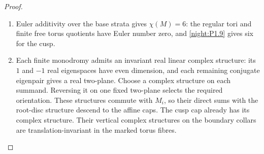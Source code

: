 \documentclass[11pt,a4paper]{article}
\numberwithin{equation}{section}
\theoremstyle{definition}
\begin{document}
\begin{proof}
\begin{enumerate}[label=\arabic*.,leftmargin=*]
We also record the invariant normal closure needed below. Let
$K$ be the smallest $\langle M_1,M_2\rangle$-invariant subgroup
containing $(M_0-I)\Lambda$, and let
$J=(M_1-I)\Lambda+(M_2-I)\Lambda=\ker\ell$.
The equality $\ell M_i=\ell$ gives $K\subseteq\ker\ell$.
On the abelian quotient $\Lambda/K$, the induced maps $a,b$
satisfy $ab=1$, $a^5=1$ and $b^4=1$. Thus $a^4=a^5=1$, so
$a=b=1$ and $J\subseteq K$. Consequently $K=J=\ker\ell$ as
integral subgroups.


Let $a_i$ be the two finite peripheral lifts. The universal covering
deck transformation of the $i$th cap has $m_i$th power equal to
translation by $v_i$, since $M_iv_i=v_i$. The collar map in
Step~1 sends $a_i$ to that transformation. Van Kampen therefore gives
\[
 a_i\lambda a_i^{-1}=M_i\lambda,
 \qquad a_1^5=v_1,\quad a_2^4=v_2,\quad a_1a_2=1.
\]
Write $a_1=t$ and $a_2=t^{-1}$. Then
$t=t^5t^{-4}=v_1+v_2$ lies in the abelian fibre subgroup. Conjugation
is consequently trivial, and that subgroup is a quotient of
$\Lambda_{\langle M_1,M_2\rangle}=\mathbb Z$, with coordinate $\ell$.
Now $\ell(v_1+v_2)=0$, so $t=0$, while $t^5=v_1$ kills its generator
$\ell(v_1)=1$. Every generator vanishes, proving $\pi_1=1$.
Equivalently, after this abelian reduction, the relations on
$(\ell,a_1,a_2)$ have matrix
\[
 \begin{pmatrix}-1&5&0\\1&0&4\\0&1&1\end{pmatrix},
 \qquad\det=-1.
\]

\item Euler additivity over the base strata gives $\chi(M)=6$:
the regular tori and finite free torus quotients have Euler number
zero, and \cref{night:P1.9} gives six for the cusp.
\item Each finite monodromy admits an invariant real linear complex
structure: its $1$ and $-1$ real eigenspaces have even dimension, and
each remaining conjugate eigenpair gives a real two-plane. Choose
a complex structure on each summand. Reversing it on one fixed
two-plane selects the required orientation. These structures commute
with $M_i$, so their direct sums with the root-disc structure descend
to the affine caps. The cusp cap already has its complex
structure. Their vertical complex structures on the boundary collars
are translation-invariant in the marked torus fibres.


\end{enumerate}
\end{proof}
\end{document}
